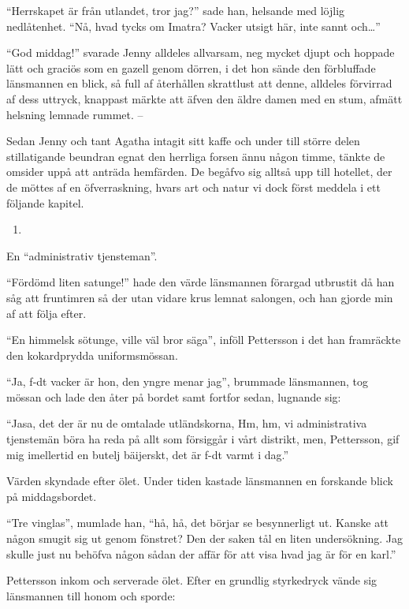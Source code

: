 ``Herrskapet är från utlandet, tror jag?'' sade han, helsande med löjlig
nedlåtenhet. ``Nå, hvad tycks om Imatra? Vacker utsigt här, inte sannt
och\ldots{}''

``God middag!'' svarade Jenny alldeles allvarsam, neg mycket djupt och
hoppade lätt och graciös som en gazell genom dörren, i det hon sände den
förbluffade länsmannen en blick, så full af återhållen skrattlust att
denne, alldeles förvirrad af dess uttryck, knappast märkte att äfven den
äldre damen med en stum, afmätt helsning lemnade rummet. --

Sedan Jenny och tant Agatha intagit sitt kaffe och under till större
delen stillatigande beundran egnat den herrliga forsen ännu någon timme,
tänkte de omsider uppå att anträda hemfärden. De begåfvo sig alltså upp
till hotellet, der de möttes af en öfverraskning, hvars art och natur vi
dock först meddela i ett följande kapitel.

\begin{enumerate}
\def\labelenumi{\arabic{enumi}.}
\setcounter{enumi}{9}
\tightlist
\item
\end{enumerate}

En ``administrativ tjensteman''.

``Fördömd liten satunge!'' hade den värde länsmannen förargad utbrustit
då han såg att fruntimren så der utan vidare krus lemnat salongen, och
han gjorde min af att följa efter.

``En himmelsk sötunge, ville väl bror säga'', inföll Pettersson i det
han framräckte den kokardprydda uniformsmössan.

``Ja, f-dt vacker är hon, den yngre menar jag'', brummade länsmannen,
tog mössan och lade den åter på bordet samt fortfor sedan, lugnande sig:

``Jasa, det der är nu de omtalade utländskorna, Hm, hm, vi
administrativa tjenstemän böra ha reda på allt som försiggår i vårt
distrikt, men, Pettersson, gif mig imellertid en butelj bäijerskt, det
är f-dt varmt i dag.''

Värden skyndade efter ölet. Under tiden kastade länsmannen en forskande
blick på middagsbordet.

``Tre vinglas'', mumlade han, ``hå, hå, det börjar se besynnerligt ut.
Kanske att någon smugit sig ut genom fönstret? Den der saken tål en
liten undersökning. Jag skulle just nu behöfva någon sådan der affär för
att visa hvad jag är för en karl.''

Pettersson inkom och serverade ölet. Efter en grundlig styrkedryck vände
sig länsmannen till honom och sporde:

